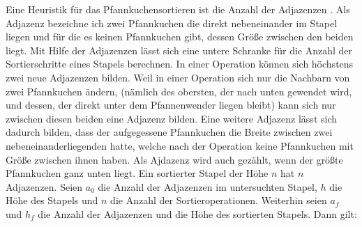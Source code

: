 \documentclass[a4paper,10pt,ngerman]{scrartcl}
\begin{document}
\begin{algorithmic}
  \EndIf
  \EndIf
  \EndFor
  \EndWhile
  \EndProcedure
\end{algorithmic}
Eine Heuristik für das Pfannkuchensortieren ist die Anzahl der Adjazenzen \cite{gates_1979}. Als Adjazenz bezeichne ich zwei
Pfannkuchen die direkt nebeneinander im Stapel liegen und für die es keinen Pfannkuchen gibt, dessen Größe zwischen den beiden liegt.
Mit Hilfe der Adjazenzen lässt sich eine untere Schranke für die Anzahl der Sortierschritte eines Stapels berechnen.
In einer Operation können sich höchstens zwei neue Adjazenzen bilden. Weil in einer Operation sich nur die Nachbarn von zwei
Pfannkuchen ändern, (nämlich des obersten, der nach unten gewendet wird, und dessen, der direkt unter dem Pfannenwender liegen bleibt)
kann sich nur zwischen diesen beiden eine Adjazenz bilden. Eine weitere Adjazenz lässt sich dadurch bilden, dass der aufgegessene
Pfannkuchen die Breite zwischen zwei nebeneinanderliegenden hatte, welche nach der Operation keine Pfannkuchen mit Größe zwischen ihnen haben.
Als Ajdazenz wird auch gezählt, wenn der größte Pfannkuchen ganz unten liegt. Ein sortierter Stapel der Höhe $n$ hat $n$ Adjazenzen.
Seien $a_0$ die Anzahl der Adjazenzen im untersuchten Stapel, $h$ die Höhe des Stapels und $n$ die Anzahl der Sortieroperationen. Weiterhin seien
$a_f$ und $h_f$ die Anzahl der Adjazenzen und die Höhe des sortierten Stapels. Dann gilt:
\end{document}

